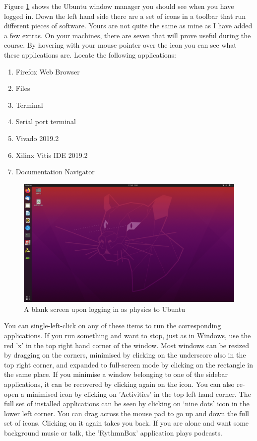 \documentclass[../physical_computing.tex]{subfiles}
\begin{document}
Figure \ref{fig:emptyscreen} shows the Ubuntu window manager you should see when you have logged in. Down the left hand side there are a set of icons in a toolbar that run different pieces of software. Yours are not quite the same as mine as I have added a few extras. On your machines, there are seven that will prove useful during the course. By hovering with your mouse pointer over the icon you can see what these applications are. Locate the following applications:

\begin{enumerate}
    \item Firefox Web Browser
    \item Files
    \item Terminal
    \item Serial port terminal
    \item Vivado 2019.2
    \item Xilinx Vitis IDE 2019.2
    \item Documentation Navigator
\end{enumerate}

\begin{figure}
    \centering
    \includegraphics[width=\textwidth]{figures/blank_ubuntu_screen.png}
    \caption{A blank screen upon logging in as physics to Ubuntu}
    \label{fig:emptyscreen}
\end{figure}

You can single-left-click on any of these items to run the corresponding applications. If you run something and want to stop, just as in Windows, use the red 'x' in the top right hand corner of the window. Most windows can be resized by dragging on the corners, minimised by clicking on the underscore also in the top right corner, and expanded to full-screen mode by clicking on the rectangle in the same place. If you minimise a window belonging to one of the sidebar applications, it can be recovered by clicking again on the icon. You can also re-open a minimised icon by clicking on 'Activities' in the top left hand corner. The full set of installed applications can be seen by clicking on `nine dots' icon in the lower left corner. You can drag across the mouse pad to go up and down the full set of icons. Clicking on it again takes you back. If you are alone and want some background music or talk, the 'RythmnBox' application plays podcasts. 
\end{document}
